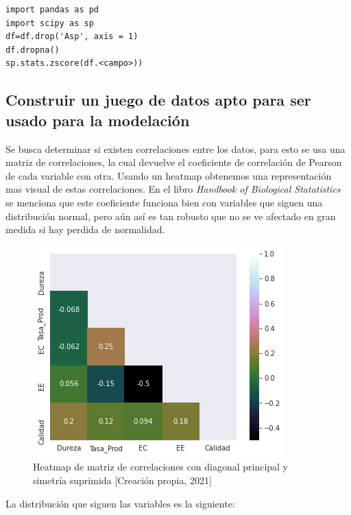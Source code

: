 \documentclass{article}
\begin{document}
\begin{verbatim}
import pandas as pd
import scipy as sp 
df=df.drop('Asp', axis = 1)
df.dropna()
sp.stats.zscore(df.<campo>))
\end{verbatim}



\subsection{Construir un juego de datos apto para ser usado para la modelación}\label{construir}

Se busca determinar si existen correlaciones entre los datos, para esto se usa una matriz de correlaciones, la cual devuelve el coeficiente de correlación de Pearson de cada variable con otra. Usando un heatmap obtenemos una representación mas visual de estas correlaciones. En el libro \emph{Handbook of Biological Statatistics} se menciona que este coeficiente funciona bien con variables que siguen una distribución normal, pero aún así es tan robusto que no se ve afectado en gran medida si hay perdida de normalidad\cite{mcdonald2009handbook}.  

\begin{figure}[h!]
    \centering
    \includegraphics[scale=.7]{histogramas/img8.png}
    \caption{Heatmap de matriz de correlaciones con diagonal principal y simetría suprimida [Creación propia, 2021]}
    \label{fig:heatmap}
\end{figure}

\pagebreak
La distribución que siguen las variables es la siguiente:
\end{document}
